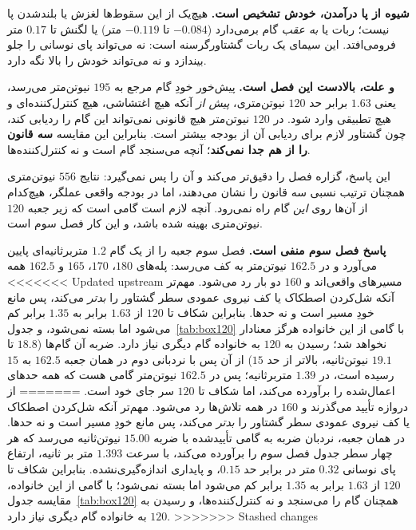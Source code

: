 \documentclass[10pt,twocolumn]{article}
\newcommand{\en}[1]{\lr{#1}}
\begin{document}
\textbf{شیوه از پا درآمدن، خودش تشخیص است.} هیچ‌یک از این سقوط‌ها لغزش یا بلندشدن پا
نیست؛ ربات یا \emph{به عقب} گام برمی‌دارد ($-0.084$ تا $-0.119$ متر) یا لگنش تا
$0.17$ متر فرومی‌افتد. این سیمای یک ربات گشتاورگرسنه است: نه می‌تواند پای نوسانی را
جلو بیندازد و نه می‌تواند خودش را بالا نگه دارد.

\textbf{و علت، بالادست این فصل است.} پیش‌خور خودِ گام مرجع به $195$ نیوتن‌متر
می‌رسد، یعنی $1.63$ برابر حد $120$ نیوتن‌متری، \emph{پیش از} آنکه هیچ اغتشاشی،
هیچ کنترل‌کننده‌ای و هیچ تطبیقی وارد شود. در $120$ نیوتن‌متر هیچ قانونی نمی‌تواند این
گام را ردیابی کند، چون گشتاور لازم برای ردیابی آن از بودجه بیشتر است. بنابراین این
مقایسه \textbf{سه قانون را از هم جدا نمی‌کند}؛ آنچه می‌سنجد گام است و نه
کنترل‌کننده‌ها.

این پاسخ، گزاره فصل را دقیق‌تر می‌کند و آن را پس نمی‌گیرد: نتایج $556$ نیوتن‌متری
همچنان ترتیب نسبی سه قانون را نشان می‌دهند، اما در بودجه واقعی
عملگر، هیچ‌کدام از آن‌ها روی \emph{این} گام راه نمی‌رود. آنچه لازم است گامی است که زیر
جعبه $120$ نیوتن‌متری بهینه شده باشد، و این کار فصل سوم است.

\textbf{پاسخ فصل سوم منفی است.} فصل سوم جعبه را از یک گام $1.2$ متربرثانیه‌ای پایین
می‌آورد و در $162.5$ نیوتن‌متر به کف می‌رسد: پله‌های $180$، $170$، $165$ و $162.5$ همه
<<<<<<< Updated upstream
مسیرهای واقعی‌اند و $160$ دو بار رد می‌شود. مهم‌تر آنکه شل‌کردن اصطکاک یا کف نیروی عمودی
سطر گشتاور را \emph{بدتر} می‌کند، پس مانع خودِ مسیر است و نه حدها. بنابراین شکاف تا
$120$ از $1.63$ برابر به $1.35$ برابر کم می‌شود اما بسته نمی‌شود، و جدول~\ref{tab:box120}
با گامی از این خانواده هرگز معنادار نخواهد شد؛ رسیدن به $120$ به خانواده گام دیگری نیاز
دارد. ضربه آن گام‌ها ($18.8$ تا $19.1$ نیوتن‌ثانیه، بالاتر از حد $15$) از آن پس با نردبانی
دوم در همان جعبه $162.5$ به $15$ رسیده است، در $1.39$ متربرثانیه؛ پس در $162.5$ نیوتن‌متر گامی
هست که همه حدهای اعمال‌شده را برآورده می‌کند، اما شکاف تا $120$ سر جای خود است.
=======
از دروازه تأیید می‌گذرند و $160$ در همه تلاش‌ها رد می‌شود. مهم‌تر آنکه شل‌کردن اصطکاک یا کف نیروی
عمودی سطر گشتاور را \emph{بدتر} می‌کند، پس مانع خودِ مسیر است و نه حدها. در همان جعبه،
نردبان ضربه به گامی تأییدشده با ضربه $15.00$ نیوتن‌ثانیه می‌رسد که هر چهار سطر جدول
\en{3.1} فصل سوم را برآورده می‌کند، با سرعت $1.393$ متر بر ثانیه، ارتفاع پای نوسانی $0.32$
متر در برابر حد $0.15$، و پایداری اندازه‌گیری‌نشده. بنابراین شکاف تا $120$ از $1.63$ برابر به
$1.35$ برابر کم می‌شود اما بسته نمی‌شود؛ با گامی از این خانواده، مقایسه
جدول~\ref{tab:box120} همچنان گام را می‌سنجد و نه کنترل‌کننده‌ها، و رسیدن به $120$ به خانواده
گام دیگری نیاز دارد.
>>>>>>> Stashed changes
\end{document}
